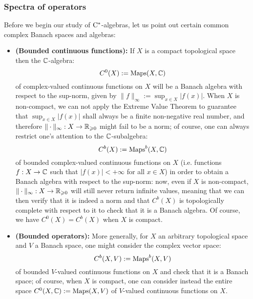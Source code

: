         \subsubsection{Spectra of operators}
            \begin{example}
                Before we begin our study of $\mathrm{C}^*$-algebras, let us point out certain common complex Banach spaces and algebras:
                    \begin{itemize}
                        \item \textbf{(Bounded continuous functions):} If $X$ is a compact topological space then the $\mathbb{C}$-algebra:
                            $$C^0(X) := \mathrm{Maps}(X, \mathbb{C})$$
                        of complex-valued continuous functions on $X$ will be a Banach algebra with respect to the sup-norm, given by $\|f\|_{\infty} := \sup_{x \in X} |f(x)|$. When $X$ is non-compact, we can not apply the Extreme Value Theorem to guarantee that $\sup_{x \in X} |f(x)|$ shall always be a finite non-negative real number, and therefore $\|\cdot\|_{\infty}: X \to \mathbb{R}_{\geqslant 0}$ might fail to be a norm; of course, one can always restrict one's attention to the $\mathbb{C}$-subalgebra:
                            $$C^b(X) := \mathrm{Maps}^b(X, \mathbb{C})$$
                        of bounded complex-valued continuous functions on $X$ (i.e. functions $f: X \to \mathbb{C}$ such that $|f(x)| < +\infty$ for all $x \in X$) in order to obtain a Banach algebra with respect to the sup-norm: now, even if $X$ is non-compact, $\|\cdot\|_{\infty}: X \to \mathbb{R}_{\geqslant 0}$ will still never return infinite values, meaning that we can then verify that it is indeed a norm and that $C^b(X)$ is topologically complete with respect to it to check that it is a Banach algebra. Of course, we have $C^0(X) = C^b(X)$ when $X$ is compact. 
                        \item \textbf{(Bounded operators):} More generally, for $X$ an arbitrary topological space and $V$ a Banach space, one might consider the complex vector space:
                            $$C^b(X, V) := \mathrm{Maps}^b(X, V)$$
                        of bounded $V$-valued continuous functions on $X$ and check that it is a Banach space; of course, when $X$ is compact, one can consider instead the entire space $C^0(X, \mathbb{C}) := \mathrm{Maps}(X, V)$ of $V$-valued continuous functions on $X$.
                        

\end{itemize}
\end{example}
